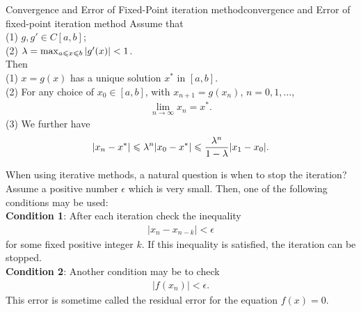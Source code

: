 \begin{theorem}{Convergence and Error of Fixed-Point iteration method}{convergence and Error of fixed-point iteration method}
    Assume that \\
    (1) $g,g'\in C[a,b]$;\\
    (2) $\lambda = \max_{a\leqslant x\leqslant b}|g'(x)|< 1$.\\
    Then \\
    (1) $x=g(x)$ has a unique solution $x^*$ in $[a,b]$.\\
    (2) For any choice of $x_0\in [a,b]$, with $x_{n+1}=g(x_n)$, $n=0,1,\dots$,
    \begin{align}
        \lim_{n\rightarrow \infty} x_n=x^*.
    \end{align}
    (3) We further have
    \begin{align}
        |x_n-x^*|\leqslant \lambda^n |x_0-x^*|\leqslant \frac{\lambda^n}{1-\lambda}|x_1-x_0|.
    \end{align}
\end{theorem}
\par
When using iterative methods, a natural question is when to stop the iteration?
Assume a positive number $\epsilon$ which is very small. Then, one of the following conditions may be used:\\
\textbf{Condition 1}: After each iteration check the inequality
\begin{align}
    |x_n-x_{n-k}|<\epsilon
\end{align}
for some fixed positive integer $k$. If this inequality is satisfied, 
the iteration can be stopped.\\
\textbf{Condition 2}: Another condition may be to check
\begin{align*}
    |f(x_n)|<\epsilon.
\end{align*}
This error is sometime called the residual error for the equation $f(x)=0$.


